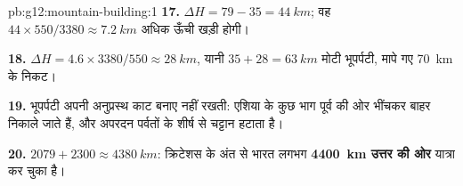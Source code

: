 \begin{solution}{pb:g12:mountain-building:1}
\textbf{17.} $\Delta H = 79 - 35 = \qty{44}{km}$; वह
$44 \times 550/3380 \approx \qty{7.2}{km}$ अधिक ऊँची खड़ी होगी।

\textbf{18.} $\Delta H = 4.6 \times 3380/550 \approx \qty{28}{km}$, यानी
$35 + 28 = \qty{63}{km}$ मोटी भूपर्पटी, मापे गए \qty{70}{km} के
निकट।

\textbf{19.} भूपर्पटी अपनी अनुप्रस्थ काट बनाए नहीं रखती: एशिया के कुछ भाग
पूर्व की ओर भींचकर बाहर निकाले जाते हैं, और अपरदन पर्वतों के शीर्ष से
चट्टान हटाता है।

\textbf{20.} $2079 + 2300 \approx \qty{4380}{km}$: क्रिटेशस के अंत से
भारत लगभग \textbf{\qty{4400}{km} उत्तर की ओर} यात्रा कर चुका है।
\end{solution}

